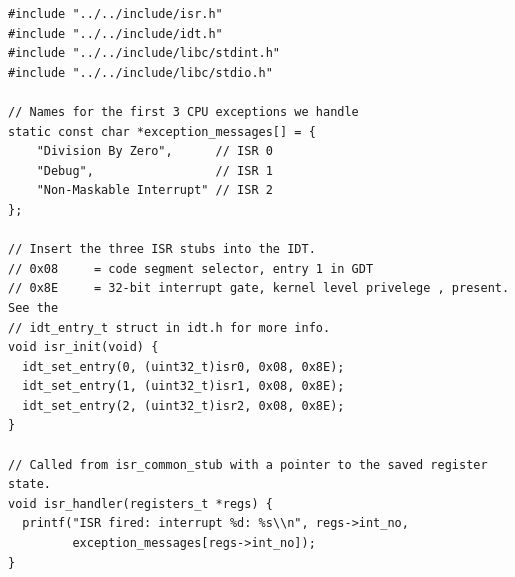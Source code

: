\documentclass[../main.tex]{subfiles}
\begin{document}
\begin{listing}[H]
    \begin{verbatim}
#include "../../include/isr.h"
#include "../../include/idt.h"
#include "../../include/libc/stdint.h"
#include "../../include/libc/stdio.h"

// Names for the first 3 CPU exceptions we handle
static const char *exception_messages[] = {
    "Division By Zero",      // ISR 0
    "Debug",                 // ISR 1
    "Non-Maskable Interrupt" // ISR 2
};

// Insert the three ISR stubs into the IDT.
// 0x08     = code segment selector, entry 1 in GDT
// 0x8E     = 32-bit interrupt gate, kernel level privelege , present. See the
// idt_entry_t struct in idt.h for more info.
void isr_init(void) {
  idt_set_entry(0, (uint32_t)isr0, 0x08, 0x8E);
  idt_set_entry(1, (uint32_t)isr1, 0x08, 0x8E);
  idt_set_entry(2, (uint32_t)isr2, 0x08, 0x8E);
}

// Called from isr_common_stub with a pointer to the saved register state.
void isr_handler(registers_t *regs) {
  printf("ISR fired: interrupt %d: %s\\n", regs->int_no,
         exception_messages[regs->int_no]);
}
    \end{verbatim}
    \caption{Implementation of \texttt{isr.c}}
    \label{lst:isr_c}
\end{listing}
\end{document}
